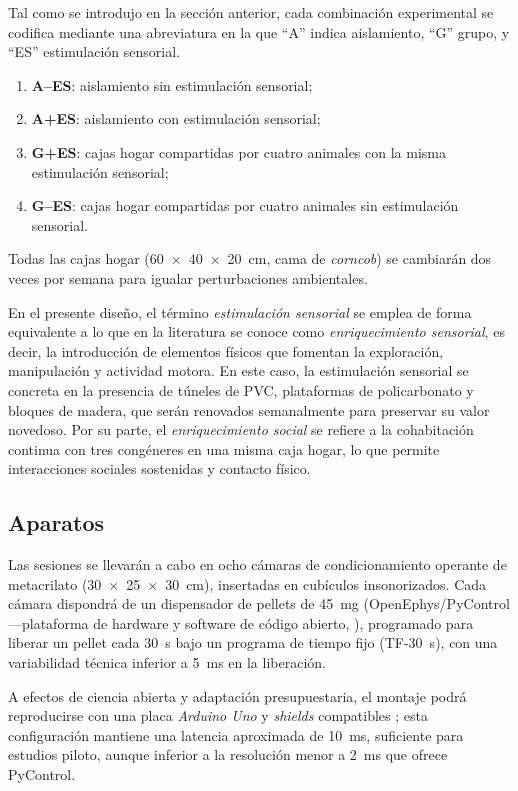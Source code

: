 \documentclass[12pt,a4paper]{article}
\begin{document}
\begin{multicols}{2}
Tal como se introdujo en la sección anterior, cada combinación experimental se codifica mediante una abreviatura en la que “A” indica aislamiento, “G” grupo, y “ES” estimulación sensorial.

\begin{enumerate}
    \item \textbf{A--ES}: aislamiento sin estimulación sensorial;
    \item \textbf{A+ES}: aislamiento con estimulación sensorial;
    \item \textbf{G+ES}: cajas hogar compartidas por cuatro animales con la misma estimulación sensorial;
    \item \textbf{G--ES}: cajas hogar compartidas por cuatro animales sin estimulación sensorial.
\end{enumerate}

Todas las cajas hogar (60~×~40~×~20~cm, cama de \textit{corncob}) se cambiarán dos veces por semana para igualar perturbaciones ambientales.

En el presente diseño, el término \textit{estimulación sensorial} se emplea de forma equivalente a lo que en la literatura se conoce como \textit{enriquecimiento sensorial}, es decir, la introducción de elementos físicos que fomentan la exploración, manipulación y actividad motora. En este caso, la estimulación sensorial se concreta en la presencia de túneles de PVC, plataformas de policarbonato y bloques de madera, que serán renovados semanalmente para preservar su valor novedoso. Por su parte, el \textit{enriquecimiento social} se refiere a la cohabitación continua con tres congéneres en una misma caja hogar, lo que permite interacciones sociales sostenidas y contacto físico.

\subsection*{Aparatos}

Las sesiones se llevarán a cabo en ocho cámaras de condicionamiento operante de metacrilato (30~×~25~×~30~cm), insertadas en cubículos insonorizados. Cada cámara dispondrá de un dispensador de pellets de 45~mg (OpenEphys/PyControl —plataforma de hardware y software de código abierto, \citep{PelletDispenserGitHub}), programado para liberar un pellet cada 30~s bajo un programa de tiempo fijo (TF-30~s), con una variabilidad técnica inferior a 5~ms en la liberación.


A efectos de ciencia abierta y adaptación presupuestaria, el montaje podrá reproducirse con una placa \textit{Arduino Uno} y \textit{shields} compatibles \citep{Arduino2024}; esta configuración mantiene una latencia aproximada de 10~ms, suficiente para estudios piloto, aunque inferior a la resolución menor a 2~ms que ofrece PyControl.


\end{multicols}
\end{document}
